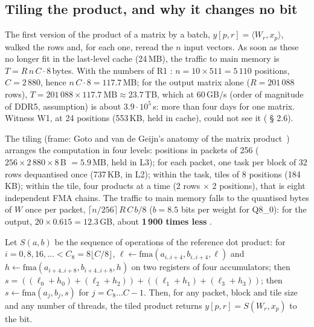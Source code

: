\subsection{Tiling the product, and why it changes no bit}\label{sec:t2r-pavage}

The first version of the product of a matrix by a batch, $y[p, r] = \langle W_r, x_p\rangle$, walked the rows and, for each one, reread the $n$ input vectors. As soon as these no longer fit in the last-level cache (24\,MB), the traffic to main memory is $T = R\,n\,C \cdot 8$\,bytes. With the numbers of R1 \calc: $n = 10 \times 511 = 5\,110$ positions, $C = 2\,880$, hence $n\,C\cdot 8 = 117.7$\,MB; for the output matrix alone ($R = 201\,088$ rows), $T = 201\,088 \times 117.7~\text{MB} \approx 23.7$\,TB, which at 60\,GB/s (order of magnitude of DDR5, assumption) is about $3.9\cdot10^5$\,s: more than four days for one matrix. Witness W1, at 24 positions (553\,KB, held in cache), could not see it ( § 2.6).

The tiling (frame: Goto and van de Geijn's anatomy of the matrix product~\cite{goto2008anatomy}) arranges the computation in four levels: positions in packets of 256 ($256 \times 2\,880 \times 8$\,B $= 5.9$\,MB, held in L3); for each packet, one task per block of 32 rows dequantised once (737\,KB, in L2); within the task, tiles of 8 positions (184\,KB); within the tile, four products at a time (2 rows $\times$ 2 positions), that is eight independent FMA chains. The traffic to main memory falls to the quantised bytes of $W$ once per packet, $\lceil n/256\rceil\, R\, C\, b/8$ ($b = 8.5$ bits per weight for Q8\_0): for the output, $20 \times 0.615 = 12.3$\,GB, about \textbf{1\,900 times less} \calc.

\begin{proposition}\label{prop:t2r-pavage}
Let $S(a, b)$ be the sequence of operations of the reference dot product: for $i = 0, 8, 16, \ldots < C_8 = 8\lfloor C/8\rfloor$, $\ell \leftarrow \mathrm{fma}(a_{i..i+4}, b_{i..i+4}, \ell)$ and $h \leftarrow \mathrm{fma}(a_{i+4..i+8}, b_{i+4..i+8}, h)$ on two registers of four accumulators; then $s = ((\ell_0 + h_0) + (\ell_2 + h_2)) + ((\ell_1 + h_1) + (\ell_3 + h_3))$; then $s \leftarrow \mathrm{fma}(a_j, b_j, s)$ for $j = C_8 \ldots C-1$. Then, for any packet, block and tile size and any number of threads, the tiled product returns $y[p, r] = S(W_r, x_p)$ to the bit.
\end{proposition}

